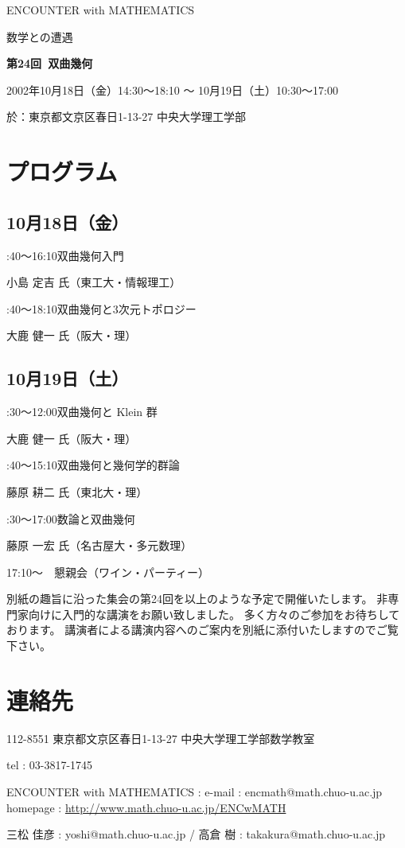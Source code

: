 \documentclass[uplatex,dvipdfmx]{jlreq}
\newcommand{\talk}[3]{%
\noindent
#1\quad #2\par
\hspace*{2em}#3\par\smallskip
}
\newcommand{\EwMnumber}{第24回}
\newcommand{\EwMtitle}{双曲幾何}
\newcommand{\EwMdate}{2002年10月18日（金）14:30～18:10 ～ 10月19日（土）10:30～17:00}
\newcommand{\EwMplace}{東京都文京区春日1-13-27 中央大学理工学部}
\newcommand{\EwMtitleblock}{

\vspace*{-5mm}

\begin{center}

{\Large ENCOUNTER with MATHEMATICS}

\vspace{2mm}

{\large 数学との遭遇}

\vspace{4mm}

{\Large \bfseries \EwMnumber\ \EwMtitle}

\vspace{4mm}

\EwMdate

\vspace{2mm}

於：\EwMplace

\end{center}

\vspace{2mm}

}
\begin{document}
\EwMtitleblock


\section*{プログラム}

\subsection*{10月18日（金）}

\talk
{14:40～16:10}
{双曲幾何入門}
{小島 定吉 氏（東工大・情報理工）}

\talk
{16:40～18:10}
{双曲幾何と3次元トポロジー}
{大鹿 健一 氏（阪大・理）}

\subsection*{10月19日（土）}

\talk
{10:30～12:00}
{双曲幾何と Klein 群}
{大鹿 健一 氏（阪大・理）}

\talk
{13:40～15:10}
{双曲幾何と幾何学的群論}
{藤原 耕二 氏（東北大・理）}

\talk
{15:30～17:00}
{数論と双曲幾何}
{藤原 一宏 氏（名古屋大・多元数理）}

\bigskip

17:10～　懇親会（ワイン・パーティー）


\bigskip

別紙の趣旨に沿った集会の第24回を以上のような予定で開催いたします。  
非専門家向けに入門的な講演をお願い致しました。  
多く方々のご参加をお待ちしております。  
講演者による講演内容へのご案内を別紙に添付いたしますのでご覧下さい。


\section*{連絡先}

112-8551 東京都文京区春日1-13-27 中央大学理工学部数学教室 

tel : 03-3817-1745  

ENCOUNTER with MATHEMATICS : e-mail : encmath@math.chuo-u.ac.jp  
homepage : \url{http://www.math.chuo-u.ac.jp/ENCwMATH}  

三松 佳彦 : yoshi@math.chuo-u.ac.jp / 高倉 樹 : takakura@math.chuo-u.ac.jp
\end{document}
